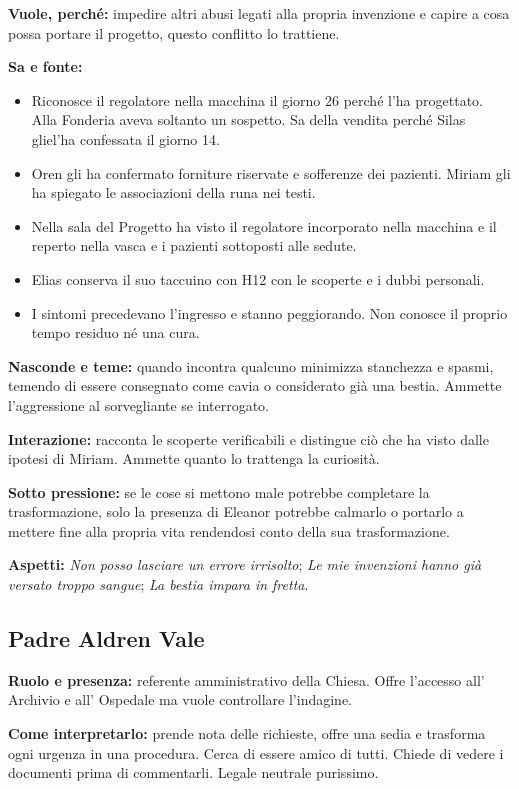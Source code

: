 \documentclass[11pt,a4paper]{article}
\newcommand{\aspect}[1]{\textit{\textcolor{blood}{#1}}}
\begin{document}
\textbf{Vuole, perché:} impedire altri abusi legati alla propria invenzione e capire a cosa possa portare il progetto, questo conflitto lo trattiene.

\textbf{Sa e fonte:}
\begin{itemize}
\item Riconosce il regolatore nella macchina il giorno 26 perché l'ha progettato. Alla Fonderia aveva soltanto un sospetto. Sa della vendita perché Silas gliel'ha confessata il giorno 14.
\item Oren gli ha confermato forniture riservate e sofferenze dei pazienti. Miriam gli ha spiegato le associazioni della runa nei testi.
\item Nella sala del Progetto ha visto il regolatore incorporato nella macchina e il reperto nella vasca e i pazienti sottoposti alle sedute.
\item Elias conserva  il suo taccuino con H12 con le scoperte e i dubbi personali.
\item I sintomi precedevano l'ingresso e stanno peggiorando. Non conosce il proprio tempo residuo né una cura.
\end{itemize}

\textbf{Nasconde e teme:} quando incontra qualcuno minimizza stanchezza e spasmi, temendo di essere consegnato come cavia o considerato già una bestia. Ammette l'aggressione al sorvegliante se interrogato.

\textbf{Interazione:} racconta le scoperte verificabili e distingue ciò che ha visto dalle ipotesi di Miriam. Ammette quanto lo trattenga la curiosità.

\textbf{Sotto pressione:} se le cose si mettono male potrebbe completare la trasformazione, solo la presenza di Eleanor potrebbe calmarlo o portarlo a mettere fine alla propria vita rendendosi conto della sua trasformazione.

\textbf{Aspetti:} \aspect{Non posso lasciare un errore irrisolto}; \aspect{Le mie invenzioni hanno già versato troppo sangue}; \aspect{La bestia impara in fretta}.\par

\subsection{Padre Aldren Vale}
\textbf{Ruolo e presenza:} referente amministrativo della Chiesa. Offre l'accesso all' Archivio e all' Ospedale ma vuole controllare l'indagine.\par
\textbf{Come interpretarlo:} prende nota delle richieste, offre una sedia e trasforma ogni urgenza in una procedura. Cerca di essere amico di tutti. Chiede di vedere i documenti prima di commentarli. Legale neutrale purissimo.
\end{document}

